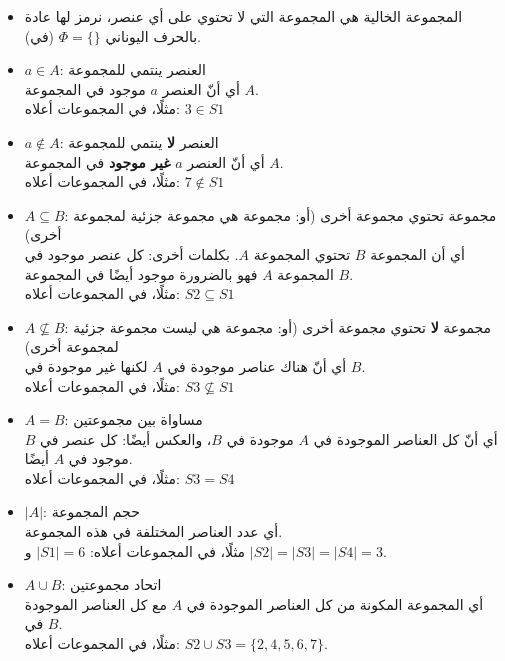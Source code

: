 \documentclass[12pt]{article}
\begin{document}
\begin{itemize}
\item المجموعة الخالية هي المجموعة التي لا تحتوي على أي عنصر، نرمز لها عادة بالحرف اليوناني $\Phi = \{\}$ (في).

\item $a \in A$: العنصر ينتمي للمجموعة\\
أي أنّ العنصر $a$ موجود في المجموعة $A$. \\
مثلًا، في المجموعات أعلاه: $3 \in S1$

\item $a \notin A$: العنصر \textbf{لا} ينتمي للمجموعة \\
أي أنّ العنصر $a$ \textbf{غير موجود} في المجموعة $A$. \\
مثلًا، في المجموعات أعلاه: $7 \notin S1$

\item $A \subseteq B$: مجموعة تحتوي مجموعة أخرى (أو: مجموعة هي مجموعة جزئية لمجموعة أخرى) \\
أي أن المجموعة $B$ تحتوي المجموعة $A$. بكلمات أخرى: كل عنصر موجود في المجموعة $A$ فهو بالضرورة موجود أيضًا في المجموعة $B$.\\
مثلًا، في المجموعات أعلاه: $S2 \subseteq S1$

\item $A \nsubseteq B$: مجموعة \textbf{لا} تحتوي مجموعة أخرى (أو: مجموعة هي ليست مجموعة جزئية لمجموعة أخرى) \\
أي أنّ هناك عناصر موجودة في $A$ لكنها غير موجودة في $B$. \\
مثلًا، في المجموعات أعلاه: $S3 \nsubseteq S1$

\item $A = B$: مساواة بين مجموعتين \\
أي أنّ كل العناصر الموجودة في $A$ موجودة في $B$، والعكس أيضًا: كل عنصر في $B$ موجود في $A$ أيضًا. \\
مثلًا، في المجموعات أعلاه: $S3 = S4$

\item $|A|$: حجم المجموعة \\
أي عدد العناصر المختلفة في هذه المجموعة. \\
مثلًا، في المجموعات أعلاه: $|S1| = 6$ و $|S2| = |S3| = |S4| = 3$.

\item $A \cup B$: اتحاد مجموعتين \\
أي المجموعة المكونة من كل العناصر الموجودة في $A$ مع كل العناصر الموجودة في $B$. \\
مثلًا، في المجموعات أعلاه: $S2 \cup S3 = \{2, 4, 5, 6, 7 \}$.


\end{itemize}
\end{document}
